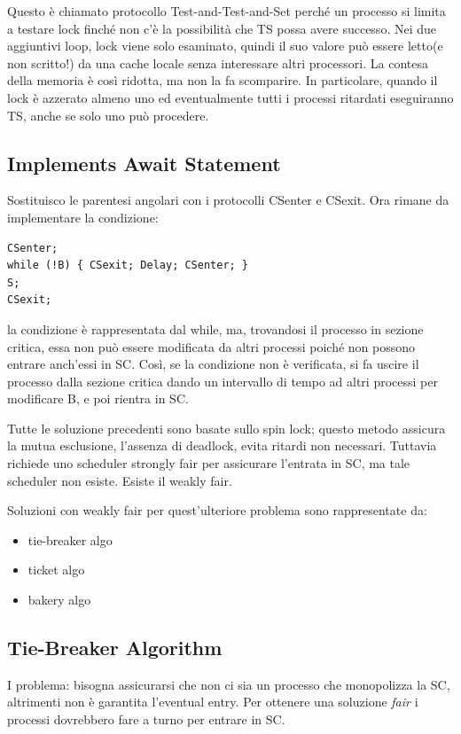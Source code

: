 \documentclass[10pt,a4paper]{book}
\begin{document}
Questo è chiamato protocollo Test-and-Test-and-Set perché un processo si limita a testare lock finché non c'è la possibilità che TS possa avere successo. Nei due aggiuntivi loop, lock viene solo esaminato, quindi il suo valore può essere letto(e non scritto!) da una cache locale senza interessare altri processori. La contesa della memoria è così ridotta, ma non la fa scomparire. In particolare, quando il lock è azzerato almeno uno ed eventualmente tutti i processi ritardati eseguiranno TS, anche se solo uno può procedere.

\subsection{Implements Await Statement}
Sostituisco le parentesi angolari con i protocolli CSenter e CSexit.
Ora rimane da implementare la condizione: 
\begin{verbatim}
CSenter;
while (!B) { CSexit; Delay; CSenter; }
S;
CSexit;
\end{verbatim}
la condizione è rappresentata dal while, ma, trovandosi il processo in sezione critica, essa non può essere modificata da altri processi poiché non possono entrare anch'essi in SC. Così, se la condizione non è verificata, si fa uscire il processo dalla sezione critica dando un intervallo di tempo ad altri processi per modificare B, e poi rientra in SC.

Tutte le soluzione precedenti sono basate sullo spin lock; questo metodo assicura la mutua esclusione, l'assenza di deadlock, evita ritardi non necessari. Tuttavia richiede uno scheduler strongly fair per assicurare l'entrata in SC, ma tale scheduler non esiste. Esiste il weakly fair.

Soluzioni con weakly fair per quest'ulteriore problema sono rappresentate da:
\begin{itemize}
\item tie-breaker algo
\item ticket algo
\item bakery algo
\end{itemize}

\subsection{Tie-Breaker Algorithm}
I problema: bisogna assicurarsi che non ci sia un processo che monopolizza la SC, altrimenti non è garantita l'eventual entry. Per ottenere una soluzione \textit{fair} i processi dovrebbero fare a turno per entrare in SC.
\end{document}
